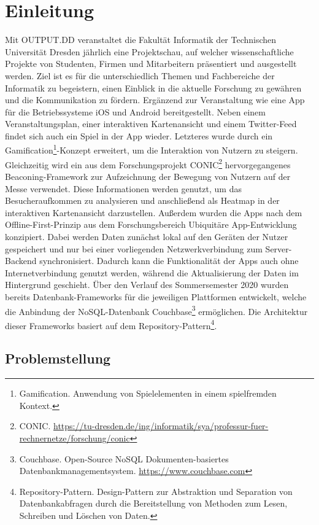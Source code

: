 \chapter{Einleitung}\label{ch:einleitung}

Mit OUTPUT.DD veranstaltet die Fakultät Informatik der Technischen Universität Dresden jährlich eine Projektschau, auf welcher wissenschaftliche Projekte von Studenten, Firmen und Mitarbeitern präsentiert und ausgestellt werden. Ziel ist es für die unterschiedlich Themen und Fachbereiche der Informatik zu begeistern, einen Einblick in die aktuelle Forschung zu gewähren und die Kommunikation zu fördern. Ergänzend zur Veranstaltung wie eine App für die Betriebssysteme iOS und Android bereitgestellt. Neben einem Veranstaltungsplan, einer interaktiven Kartenansicht und einem Twitter-Feed findet sich auch ein Spiel in der App wieder. Letzteres wurde durch ein Gamification\footnote{Gamification. Anwendung von Spielelementen in einem spielfremden Kontext.}-Konzept erweitert, um die Interaktion von Nutzern zu steigern. Gleichzeitig wird ein aus dem Forschungsprojekt CONIC\footnote{CONIC. \url{https://tu-dresden.de/ing/informatik/sya/professur-fuer-rechnernetze/forschung/conic}} hervorgegangenes Beaconing-Framework zur Aufzeichnung der Bewegung von Nutzern auf der Messe verwendet. Diese Informationen werden genutzt, um das Besucheraufkommen zu analysieren und anschließend als Heatmap in der interaktiven Kartenansicht darzustellen. Außerdem wurden die Apps nach dem Offline-First-Prinzip aus dem Forschungsbereich Ubiquitäre App-Entwicklung konzipiert. Dabei werden Daten zunächst lokal auf den Geräten der Nutzer gespeichert und nur bei einer vorliegenden Netzwerkverbindung zum Server-Backend synchronisiert. Dadurch kann die Funktionalität der Apps auch ohne Internetverbindung genutzt werden, während die Aktualisierung der Daten im Hintergrund geschieht. Über den Verlauf des Sommersemester 2020 wurden bereits Datenbank-Frameworks für die jeweiligen Plattformen entwickelt, welche die Anbindung der NoSQL-Datenbank Couchbase\footnote{Couchbase. Open-Source NoSQL Dokumenten-basiertes Datenbankmanagementsystem. \newline \url{https://www.couchbase.com}} ermöglichen. Die Architektur dieser Frameworks basiert auf dem Repository-Pattern\footnote{Repository-Pattern. Design-Pattern zur Abstraktion und Separation von Datenbankabfragen durch die Bereitstellung von Methoden zum Lesen, Schreiben und Löschen von Daten.}.

\section{Problemstellung}

